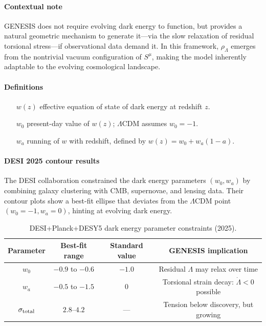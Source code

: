 \documentclass{article}
\begin{document}
\paragraph{Contextual note}
GENESIS does not require evolving dark energy to function, but provides a natural geometric mechanism to generate it—via the slow relaxation of residual torsional stress—if observational data demand it. In this framework, $\rho_\Lambda$ emerges from the nontrivial vacuum configuration of $S^\mu$, making the model inherently adaptable to the evolving cosmological landscape.

\paragraph{Definitions}
\begin{itemize}[leftmargin=*]
  \item[$w(z)$] effective equation of state of dark energy at redshift $z$.
  \item[$w_0$] present-day value of $w(z)$; $\Lambda$CDM assumes $w_0=-1$.
  \item[$w_a$] running of $w$ with redshift, defined by $w(z) = w_0 + w_a(1 - a)$.
\end{itemize}

\paragraph{DESI 2025 contour results}
The DESI collaboration constrained the dark energy parameters $(w_0, w_a)$ by combining galaxy clustering with CMB, supernovae, and lensing data. Their contour plots show a best-fit ellipse that deviates from the $\Lambda$CDM point $(w_0 = -1, w_a = 0)$, hinting at evolving dark energy.

\begin{table}[h!]
\centering
\renewcommand{\arraystretch}{1.2}
\begin{tabular}{|c|c|c|c|}
\hline
\textbf{Parameter} & \textbf{Best-fit range} & \textbf{Standard value} & \textbf{GENESIS implication} \\
\hline
$w_0$ & $-0.9$ to $-0.6$ & $-1.0$ & Residual $\Lambda$ may relax over time \\
\hline
$w_a$ & $-0.5$ to $-1.5$ & $0$ & Torsional strain decay: $\dot\Lambda < 0$ possible \\
\hline
$\sigma_{\rm total}$ & $2.8$–$4.2$ & — & Tension below discovery, but growing \\
\hline
\end{tabular}
\caption{DESI+Planck+DESY5 dark energy parameter constraints (2025).}
\label{tab:DESI-contour}
\end{table}
\end{document}
